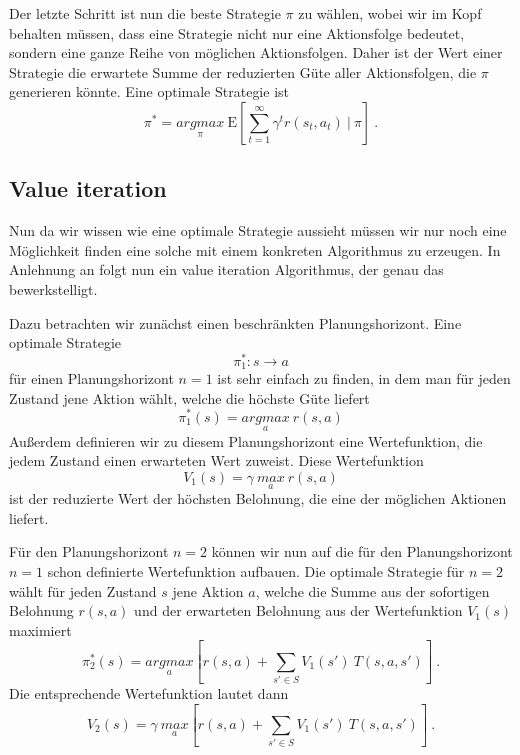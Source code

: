 \documentclass[a4paper]{IEEEtran}
\def\E{\mathrm{E}} %
\begin{document}
Der letzte Schritt ist nun die beste Strategie $\pi$ zu wählen, wobei wir im Kopf behalten müssen, dass eine Strategie nicht nur eine Aktionsfolge bedeutet, sondern eine ganze Reihe von möglichen Aktionsfolgen. Daher ist der Wert einer Strategie die erwartete Summe der reduzierten Güte aller Aktionsfolgen, die $\pi$ generieren könnte. Eine optimale Strategie ist
\begin{equation}
	\pi^* = \underset{\pi}{argmax}\ \E \left[ \sum\limits_{t=1}^{\infty} \gamma^t r(s_t, a_t) \ \vert\ \pi \right]\ .
\end{equation}

\subsection{Value iteration}
\label{sec:valueIteration}
Nun da wir wissen wie eine optimale Strategie aussieht müssen wir nur noch eine Möglichkeit finden eine solche mit einem konkreten Algorithmus zu erzeugen. In Anlehnung an \cite{thrun2005probabilistic} folgt nun ein value iteration Algorithmus, der genau das bewerkstelligt.

Dazu betrachten wir zunächst einen beschränkten Planungshorizont. Eine optimale Strategie 
\begin{equation}
	\pi_1^*: s \rightarrow a
\end{equation}
für einen Planungshorizont $n=1$ ist sehr einfach zu finden, in dem man für jeden Zustand jene Aktion wählt, welche die höchste Güte liefert
\begin{equation}
	\pi_1^*(s)= \underset{a}{argmax}\ r(s, a)
\end{equation}
Außerdem definieren wir zu diesem Planungshorizont eine Wertefunktion, die jedem Zustand einen erwarteten Wert zuweist. Diese Wertefunktion
\begin{equation}
	V_1(s) = \gamma\ \underset{a}{max}\ r(s, a)
\end{equation}
ist der reduzierte Wert der höchsten Belohnung, die eine der möglichen Aktionen liefert.

Für den Planungshorizont $n=2$ können wir nun auf die für den Planungshorizont $n=1$ schon definierte Wertefunktion aufbauen. Die optimale Strategie für $n=2$ wählt für jeden Zustand $s$ jene Aktion $a$, welche die Summe aus der sofortigen Belohnung $r(s,a)$ und der erwarteten Belohnung aus der Wertefunktion $V_1(s)$ maximiert
\begin{equation}
	\pi_2^*(s) = \underset{a}{argmax} \left[ r(s,a) + \sum_{s' \in S} V_1(s')\ T(s, a, s') \right]\ .
\end{equation}
Die entsprechende Wertefunktion lautet dann
\begin{equation}
	V_2(s) = \gamma\ \underset{a}{max} \left[ r(s,a) + \sum_{s' \in S} V_1(s')\ T(s, a, s') \right]\ .
\end{equation}
\end{document}
